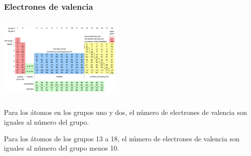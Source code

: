 \documentclass{beamer}
\begin{document}
\begin{frame}


    \frametitle{Electrones de valencia}
    \begin{columns}
        
        \begin{column}{0.5\textwidth}
            \includegraphics[width=6cm]{../../../../public/images/pTable.png}
            
        \end{column}
        \begin{column}{0.5\textwidth}

            
        \end{column}
    \end{columns}

    \vspace{1cm}

    \onslide Para los átomos en los grupos
    \pause \alert{uno}
    \onslide y
    \pause \alert{dos},
    \onslide el número de
    \pause \alert{electrones de valencia}
    \onslide son iguales al número del grupo.
    
    \vspace{1cm}
    

    \onslide Para los átomos de los grupos
    \pause \alert{13}
    \onslide a
    \pause \alert{18},
    \onslide el número de
    \pause \alert{electrones de valencia}
    \onslide son iguales al número del grupo menos 10.
\end{frame}
\end{document}
